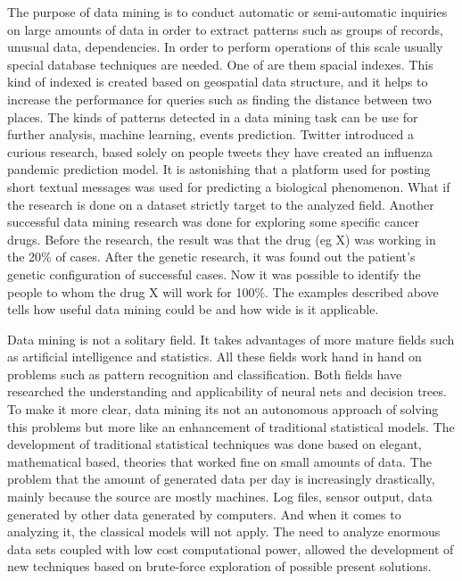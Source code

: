 The purpose of data mining is to conduct automatic or semi-automatic inquiries on large amounts of data in order to extract patterns such as groups of records, unusual data, dependencies. In order to perform operations of this scale usually special database techniques are needed. One of are them spacial indexes. This kind of indexed is created based on geospatial data structure, and it helps to increase the performance for queries such as finding the distance between two places. The kinds of patterns detected in a data mining task can be use for further analysis, machine learning, events prediction. Twitter introduced a curious research, based solely on people tweets they have created an influenza pandemic prediction model. It is astonishing that a platform used for posting short textual messages was used for predicting a biological phenomenon. What if the research is done on a dataset strictly target to the analyzed field. Another successful data mining research was done for exploring some specific cancer drugs. Before the research, the result was that the drug (eg X) was working in the 20\% of cases. After the genetic research, it was found out the patient's genetic configuration of successful cases. Now it was possible to identify the people to whom the drug X will work for 100\%. The examples described above tells how useful data mining could be and how wide is it applicable.

Data mining is not a solitary field. It takes advantages of more mature fields such as artificial intelligence and statistics. All these fields work hand in hand on problems such as pattern recognition and classification. Both fields have researched the understanding and applicability of neural nets and decision trees. To make it more clear, data mining its not an autonomous approach of solving this problems but more like an enhancement of traditional statistical models. The development of traditional statistical techniques was done based on elegant, mathematical based, theories that worked fine on small amounts of data. The problem that the amount of generated data per day is increasingly drastically, mainly because the source are mostly machines. Log files, sensor output, data generated by other data generated by computers. And when it comes to analyzing it, the classical models will not apply. The need to analyze enormous data sets coupled with low cost computational power, allowed the development of new techniques based on brute-force exploration of possible present solutions.

